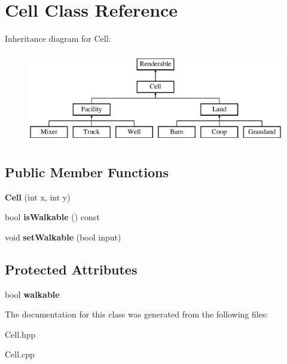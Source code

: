 \hypertarget{class_cell}{}\section{Cell Class Reference}
\label{class_cell}
Inheritance diagram for Cell\+:\begin{figure}[H]
\begin{center}
\leavevmode
\includegraphics[height=4.000000cm]{class_cell}
\end{center}
\end{figure}
\subsection*{Public Member Functions}
\begin{DoxyCompactItemize}
\item 
\mbox{\label{class_cell_aa39ad04eeebb7bf00d592ad36640337e}} 
{\bfseries Cell} (int x, int y)
\item 
\mbox{\label{class_cell_aa28cd3093696dee2dd9d3dbb345e97d4}} 
bool {\bfseries is\+Walkable} () const
\item 
\mbox{\label{class_cell_aaf45016e189cec4ba44dad4d25a8d143}} 
void {\bfseries set\+Walkable} (bool input)
\end{DoxyCompactItemize}
\subsection*{Protected Attributes}
\begin{DoxyCompactItemize}
\item 
\mbox{\label{class_cell_a4fca88b299a6602cc87ec5b9a21b9778}} 
bool {\bfseries walkable}
\end{DoxyCompactItemize}


The documentation for this class was generated from the following files\+:\begin{DoxyCompactItemize}
\item 
Cell.\+hpp\item 
Cell.\+cpp\end{DoxyCompactItemize}
